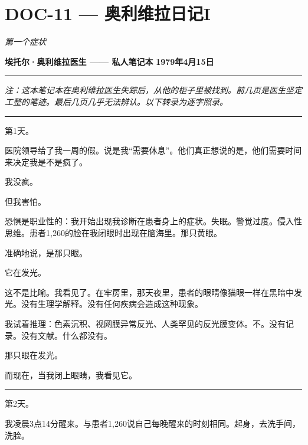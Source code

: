 \section*{\textbf{DOC-11} --- 奥利维拉日记I}

\noindent \textit{第一个症状}

\noindent \textbf{埃托尔·奥利维拉医生 —— 私人笔记本}
\textbf{1979年4月15日}

\vspace{0.5em}\noindent\rule{\textwidth}{0.5pt}\vspace{0.5em}

\noindent \textit{注：这本笔记本在奥利维拉医生失踪后，从他的柜子里被找到。前几页是医生坚定工整的笔迹。最后几页几乎无法辨认。以下转录为逐字照录。}

\vspace{0.5em}\noindent\rule{\textwidth}{0.5pt}\vspace{0.5em}

\noindent 第1天。

\noindent 医院领导给了我一周的假。说是我“需要休息”。他们真正想说的是，他们需要时间来决定我是不是疯了。

\noindent 我没疯。

\noindent 但我害怕。

\noindent 恐惧是职业性的：我开始出现我诊断在患者身上的症状。失眠。警觉过度。侵入性思维。患者1,260的脸在我闭眼时出现在脑海里。那只黄眼。

\noindent 准确地说，是那只眼。

\noindent 它在发光。

\noindent 这不是比喻。我看见了。在牢房里，那天夜里，患者的眼睛像猫眼一样在黑暗中发光。没有生理学解释。没有任何疾病会造成这种现象。

\noindent 我试着推理：色素沉积、视网膜异常反光、人类罕见的反光膜变体。不。没有记录。没有文献。什么都没有。

\noindent 那只眼在发光。

\noindent 而现在，当我闭上眼睛，我看见它。

\vspace{0.5em}\noindent\rule{\textwidth}{0.5pt}\vspace{0.5em}

\noindent 第2天。

\noindent 我凌晨3点14分醒来。与患者1,260说自己每晚醒来的时刻相同。起身，去洗手间，洗脸。

